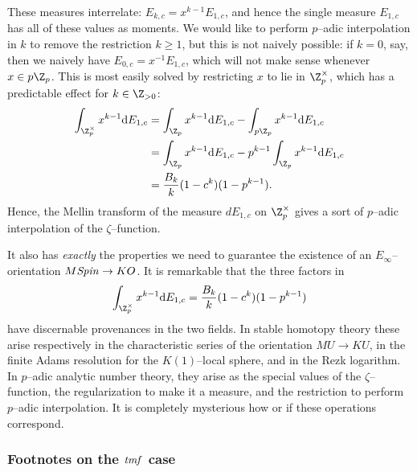 These measures interrelate: \(E_{k, c} = x^{k-1} E_{1, c}\), and hence the single measure \(E_{1, c}\) has all of these values as moments.  We would like to perform \(p\)--adic interpolation in \(k\) to remove the restriction \(k \ge 1\), but this is not naively possible: if \(k = 0\), say, then we naively have \(E_{0, c} = x^{-1} E_{1, c}\), which will not make sense whenever \(x \in p\Z_p\).  This is most easily solved by restricting \(x\) to lie in \(\Z_p^\times\), which has a predictable effect for \(k \in \Z_{> 0}\):
\begin{align*}
\int_{\Z_p^\times} x^{k-1} \mathrm dE_{1,c} & = \int_{\Z_p} x^{k-1} \mathrm dE_{1,c} - \int_{p\Z_p} x^{k-1} \mathrm dE_{1, c} \\
& = \int_{\Z_p} x^{k-1} \mathrm dE_{1,c} - p^{k-1} \int_{\Z_p} x^{k-1} \mathrm dE_{1, c} \\
& = \frac{B_k}{k}(1 - c^k)(1 - p^{k-1}).
\end{align*}
Hence, the Mellin transform of the measure \(dE_{1,c}\) on \(\Z_p^\times\) gives a sort of \(p\)--adic interpolation of the \(\zeta\)--function.

It also has \emph{exactly} the properties we need to guarantee the existence of an \(E_\infty\)--orientation \(M\mathit{Spin} \to KO\).  It is remarkable that the three factors in \[\int_{\Z_p^\times} x^{k-1} \mathrm d E_{1, c} = \frac{B_k}{k} (1 - c^k)(1 - p^{k-1})\] have discernable provenances in the two fields.  In stable homotopy theory these arise respectively in the characteristic series of the orientation \(MU \to KU\), in the finite Adams resolution for the \(K(1)\)--local sphere, and in the Rezk logarithm.  In \(p\)--adic analytic number theory, they arise as the special values of the \(\zeta\)--function, the regularization to make it a measure, and the restriction to perform \(p\)--adic interpolation.  It is completely mysterious how or if these operations correspond.


\subsubsection{Footnotes on the \(\mathit{tmf}\) case}

